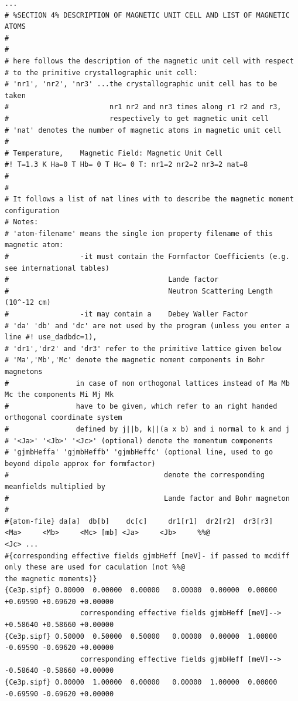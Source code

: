 {\footnotesize
\begin{verbatim}
...
# %SECTION 4% DESCRIPTION OF MAGNETIC UNIT CELL AND LIST OF MAGNETIC ATOMS
#
#
# here follows the description of the magnetic unit cell with respect
# to the primitive crystallographic unit cell:
# 'nr1', 'nr2', 'nr3' ...the crystallographic unit cell has to be taken 
#                        nr1 nr2 and nr3 times along r1 r2 and r3,
#                        respectively to get magnetic unit cell
# 'nat' denotes the number of magnetic atoms in magnetic unit cell
#
# Temperature,    Magnetic Field: Magnetic Unit Cell
#! T=1.3 K Ha=0 T Hb= 0 T Hc= 0 T: nr1=2 nr2=2 nr3=2 nat=8 
#
#
# It follows a list of nat lines with to describe the magnetic moment configuration
# Notes:
# 'atom-filename' means the single ion property filename of this magnetic atom:
#                 -it must contain the Formfactor Coefficients (e.g. see international tables)
#                                      Lande factor
#                                      Neutron Scattering Length (10^-12 cm) 
#                 -it may contain a    Debey Waller Factor
# 'da' 'db' and 'dc' are not used by the program (unless you enter a line #! use_dadbdc=1), 
# 'dr1','dr2' and 'dr3' refer to the primitive lattice given below
# 'Ma','Mb','Mc' denote the magnetic moment components in Bohr magnetons
#                in case of non orthogonal lattices instead of Ma Mb Mc the components Mi Mj Mk
#                have to be given, which refer to an right handed orthogonal coordinate system 
#                defined by j||b, k||(a x b) and i normal to k and j
# '<Ja>' '<Jb>' '<Jc>' (optional) denote the momentum components 
# 'gjmbHeffa' 'gjmbHeffb' 'gjmbHeffc' (optional line, used to go beyond dipole approx for formfactor)
#                                     denote the corresponding meanfields multiplied by 
#                                     Lande factor and Bohr magneton 
#
#{atom-file} da[a]  db[b]    dc[c]     dr1[r1]  dr2[r2]  dr3[r3]   <Ma>     <Mb>     <Mc> [mb] <Ja>     <Jb>     %%@
<Jc> ...
#{corresponding effective fields gjmbHeff [meV]- if passed to mcdiff only these are used for caculation (not %%@
the magnetic moments)}
{Ce3p.sipf} 0.00000  0.00000  0.00000   0.00000  0.00000  0.00000   +0.69590 +0.69620 +0.00000  
                  corresponding effective fields gjmbHeff [meV]--> +0.58640 +0.58660 +0.00000
{Ce3p.sipf} 0.50000  0.50000  0.50000   0.00000  0.00000  1.00000   -0.69590 -0.69620 +0.00000  
                  corresponding effective fields gjmbHeff [meV]--> -0.58640 -0.58660 +0.00000
{Ce3p.sipf} 0.00000  1.00000  0.00000   0.00000  1.00000  0.00000   -0.69590 -0.69620 +0.00000  

\end{verbatim}}
